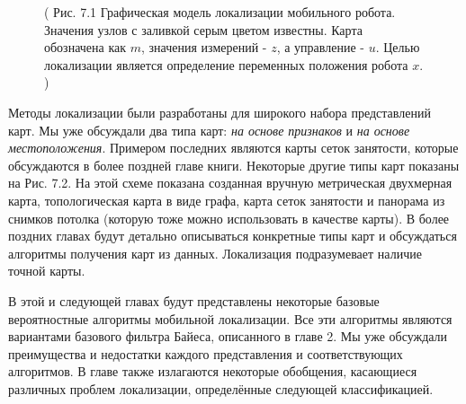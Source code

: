 \documentclass[10pt,a4paper]{article}
\begin{document}
\begin{figure}[H]
	\caption{ (  Рис. 7.1 Графическая модель локализации мобильного робота. Значения узлов с заливкой серым цветом известны. Карта обозначена как $m$, значения измерений - $z$, а управление - $u$. Целью локализации является определение переменных положения робота $x$.
		)}
	\label{fig:71orig}
\end{figure}

Методы локализации были разработаны для широкого набора представлений карт. Мы уже обсуждали два типа карт: \textit{на основе признаков} и \textit{на основе местоположения}. Примером последних являются карты сеток занятости, которые обсуждаются в более поздней главе книги. Некоторые другие типы карт показаны на Рис. 7.2. На этой схеме показана созданная вручную метрическая двухмерная карта, топологическая карта в виде графа, карта сеток занятости и панорама из снимков потолка (которую тоже можно использовать в качестве карты). В более поздних главах будут детально описываться конкретные типы карт и обсуждаться алгоритмы получения карт из данных. Локализация подразумевает наличие точной карты. 

В этой и следующей главах будут представлены некоторые базовые вероятностные алгоритмы мобильной локализации. Все эти алгоритмы являются вариантами базового фильтра Байеса, описанного в главе 2. Мы уже обсуждали преимущества и недостатки каждого представления и соответствующих алгоритмов. В главе также излагаются некоторые обобщения, касающиеся различных проблем локализации, определённые следующей классификацией. 
\end{document}
